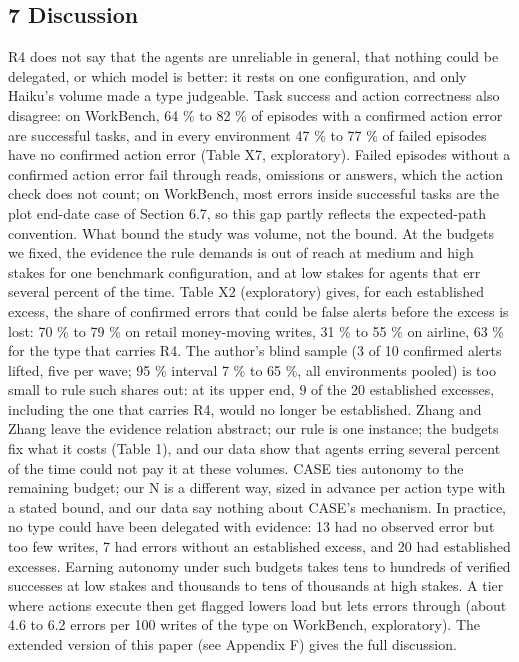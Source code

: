 \subsection{7 Discussion}\label{discussion}

R4 does not say that the agents are unreliable in general, that nothing could be delegated, or which model is better: it rests on one configuration, and only Haiku's volume made a type judgeable. Task success and action correctness also disagree: on WorkBench, 64 \% to 82 \% of episodes with a confirmed action error are successful tasks, and in every environment 47 \% to 77 \% of failed episodes have no confirmed action error (Table X7, exploratory). Failed episodes without a confirmed action error fail through reads, omissions or answers, which the action check does not count; on WorkBench, most errors inside successful tasks are the plot end-date case of Section 6.7, so this gap partly reflects the expected-path convention. What bound the study was volume, not the bound. At the budgets we fixed, the evidence the rule demands is out of reach at medium and high stakes for one benchmark configuration, and at low stakes for agents that err several percent of the time. Table X2 (exploratory) gives, for each established excess, the share of confirmed errors that could be false alerts before the excess is lost: 70 \% to 79 \% on retail money-moving writes, 31 \% to 55 \% on airline, 63 \% for the type that carries R4. The author's blind sample (3 of 10 confirmed alerts lifted, five per wave; 95 \% interval 7 \% to 65 \%, all environments pooled) is too small to rule such shares out: at its upper end, 9 of the 20 established excesses, including the one that carries R4, would no longer be established. Zhang and Zhang leave the evidence relation abstract; our rule is one instance; the budgets fix what it costs (Table 1), and our data show that agents erring several percent of the time could not pay it at these volumes. CASE ties autonomy to the remaining budget; our N is a different way, sized in advance per action type with a stated bound, and our data say nothing about CASE's mechanism. In practice, no type could have been delegated with evidence: 13 had no observed error but too few writes, 7 had errors without an established excess, and 20 had established excesses. Earning autonomy under such budgets takes tens to hundreds of verified successes at low stakes and thousands to tens of thousands at high stakes. A tier where actions execute then get flagged lowers load but lets errors through (about 4.6 to 6.2 errors per 100 writes of the type on WorkBench, exploratory). The extended version of this paper (see Appendix F) gives the full discussion.

